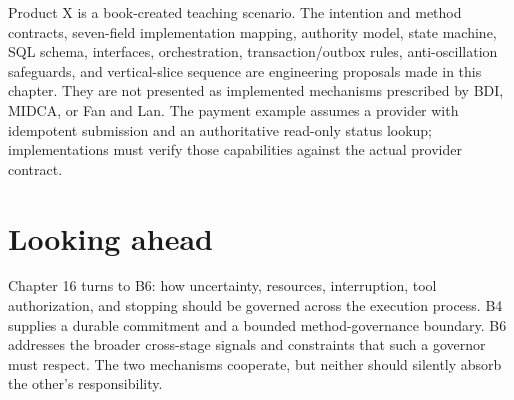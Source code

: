 Product X is a book-created teaching scenario. The intention and method contracts, seven-field implementation mapping, authority model, state machine, SQL schema, interfaces, orchestration, transaction/outbox rules, anti-oscillation safeguards, and vertical-slice sequence are engineering proposals made in this chapter. They are not presented as implemented mechanisms prescribed by BDI, MIDCA, or Fan and Lan. The payment example assumes a provider with idempotent submission and an authoritative read-only status lookup; implementations must verify those capabilities against the actual provider contract.

\autocite{rao1991modelingbdi,rao1995bdi,kinny1991commitment,cox2016midca,owayyed2025controlled,lawton2026selfawarebdi,wang2024devilsadvocate,liang2025cca,arike2025goaldrift,mehta2026premature,hu2024adas,zhang2024aflow,gupta2024metareflection}

\section*{Looking ahead}

Chapter 16 turns to B6: how uncertainty, resources, interruption, tool authorization, and stopping should be governed across the execution process. B4 supplies a durable commitment and a bounded method-governance boundary. B6 addresses the broader cross-stage signals and constraints that such a governor must respect. The two mechanisms cooperate, but neither should silently absorb the other's responsibility.
